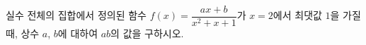 실수 전체의 집합에서 정의된 함수 $f(x)=\dfrac{ax+b}{x^2+x+1}$가 $x=2$에서 최댓값 $1$을 가질 때, 상수 $a$, $b$에 대하여 $ab$의 값을 구하시오.
